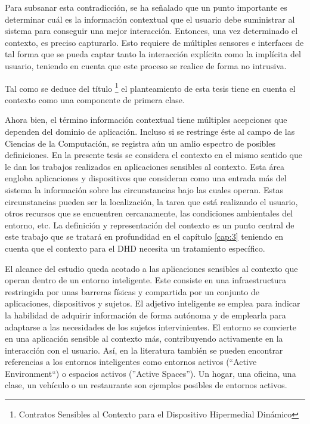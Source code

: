 {Para subsanar esta contradicción, se ha señalado que un punto importante es determinar cuál es la
información contextual que el usuario debe suministrar al sistema para
conseguir una mejor interacción. Entonces, una vez determinado el contexto, es
preciso capturarlo. Esto requiere de múltiples sensores e interfaces de
tal forma que se pueda captar tanto la interacción explícita como la implícita
del usuario, teniendo en cuenta que este proceso se realice de
forma no intrusiva.  

Tal como se deduce del título \footnote{Contratos Sensibles al Contexto
para el Dispositivo Hipermedial Dinámico} el planteamiento de esta tesis
tiene en cuenta el contexto como una componente de primera clase.

Ahora bien, el término información contextual tiene múltiples acepciones
que dependen del dominio de aplicación. Incluso si se restringe éste al campo de
las Ciencias de la Computación, se registra aún un amlio espectro de posibles definiciones. En la presente tesis se considera el contexto en el mismo sentido
que le dan los trabajos realizados en aplicaciones sensibles al contexto. Esta
área engloba aplicaciones y dispositivos que consideran como una entrada más del
sistema la información sobre las circunstancias bajo las cuales operan. Estas
circunstancias pueden ser la localización, la tarea que está realizando el
usuario, otros recursos que se encuentren cercanamente, las condiciones ambientales del
entorno, etc. La definición y representación del contexto es un punto central de
este trabajo que se tratará en profundidad en el capítulo \ref{cap:3} teniendo en
cuenta que el contexto para el DHD necesita un tratamiento específico. 

El alcance del estudio queda acotado a las aplicaciones sensibles al contexto
que operan dentro de un entorno inteligente. Este consiste en una
infraestructura restringida por unas barreras físicas y compartida por un
conjunto de aplicaciones, dispositivos y sujetos. El adjetivo inteligente se
emplea para indicar la habilidad de adquirir información de forma autónoma y de
emplearla para adaptarse a las necesidades de los sujetos intervinientes. El
entorno se convierte en una aplicación sensible al contexto más, contribuyendo
activamente en la interacción con el usuario. Así, en la literatura también se
pueden encontrar referencias a los entornos inteligentes como entornos activos
(``Active Environment``) o espacios activos (''Active Spaces''). Un
hogar, una oficina, una clase, un vehículo o un restaurante son ejemplos
posibles de entornos activos. 

}
